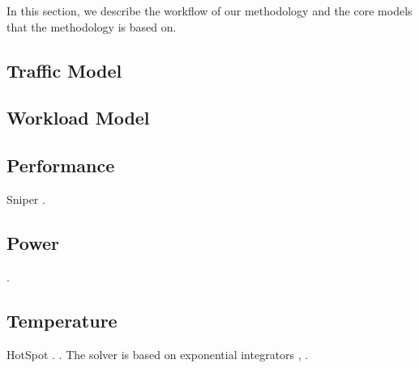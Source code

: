 In this section, we describe the workflow of our methodology and the core models
that the methodology is based on.

\subsection{Traffic Model}


\subsection{Workload Model}


\subsection{Performance}
Sniper \cite{carlson2011}.


\subsection{Power}
 \cite{li2009}.

\subsection{Temperature}
HotSpot \cite{skadron2004}.
 \cite{sridhar2010}.
The solver is based on exponential integrators \cite{hochbruck2010},
\cite{ukhov2012}.

